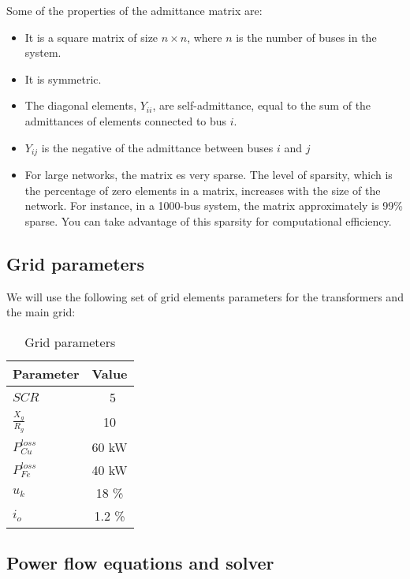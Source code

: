 \documentclass[a4paper,11pt, titlepage, twoside]{article}
\begin{document}
Some of the properties of the admittance matrix are:
\begin{itemize}[itemsep=0pt]
    \item It is a square matrix of size $n \times n$, where $n$ is the number of buses in the system.
    \item It is symmetric.
    \item The diagonal elements, $Y_{ii}$, are self-admittance, equal to the sum of the admittances of elements connected to bus $i$.
    \item $Y_{ij}$ is the negative of the admittance between buses $i$ and $j$
    \item For large networks, the matrix es very sparse. The level of sparsity, which is the percentage of zero elements in a matrix, increases with the size of the network.
    For instance, in a 1000-bus system, the matrix approximately is 99\% sparse. You can take advantage of this sparsity for computational efficiency.
\end{itemize}

\subsection{Grid parameters}

We will use the following set of grid elements parameters for the transformers and the main grid:
\begin{table}[h]
    \centering
    \renewcommand{\arraystretch}{1.2}
    \begin{tabular}{l|c}
    \hline
    \textbf{Parameter} & \textbf{Value} \\
    \hline
    $SCR$ & \ 5 \\
    $\frac{X_g}{R_g}$ & 10 \\
    $P_{Cu}^{loss}$ & 60 kW \\
    $P_{Fe}^{loss}$ & 40 kW \\
    $u_k$ & 18 \%  \\
    $i_o$ & 1.2 \% \\
    \hline
    \end{tabular}
    \caption{Grid parameters \cite{paperbase}}
    \label{tab:gridparameters}
    \end{table}

\newpage

\subsection{Power flow equations and solver}
\end{document}
